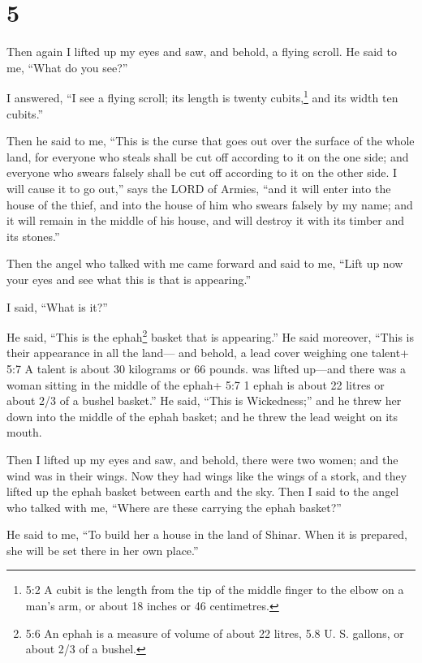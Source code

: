 \hypertarget{section-4}{%
\section{5}\label{section-4}}

 Then again I lifted up my eyes and saw, and behold, a
flying scroll.  He said to me, ``What do you see?''

I answered, ``I see a flying scroll; its length is twenty
cubits,\footnote{5:2 A cubit is the length from the tip of the middle
  finger to the elbow on a man's arm, or about 18 inches or 46
  centimetres.} and its width ten cubits.''

 Then he said to me, ``This is the curse that goes out over
the surface of the whole land, for everyone who steals shall be cut off
according to it on the one side; and everyone who swears falsely shall
be cut off according to it on the other side.  I will cause
it to go out,'' says the LORD of Armies, ``and it will enter into the
house of the thief, and into the house of him who swears falsely by my
name; and it will remain in the middle of his house, and will destroy it
with its timber and its stones.''

 Then the angel who talked with me came forward and said to
me, ``Lift up now your eyes and see what this is that is appearing.''

 I said, ``What is it?''

He said, ``This is the ephah\footnote{5:6 An ephah is a measure of
  volume of about 22 litres, 5.8 U. S. gallons, or about 2/3 of a
  bushel.} basket that is appearing.'' He said moreover, ``This is their
appearance in all the land---  and behold, a lead cover
weighing one talent+ 5:7 A talent is about 30 kilograms or 66 pounds.
was lifted up---and there was a woman sitting in the middle of the
ephah+ 5:7 1 ephah is about 22 litres or about 2/3 of a bushel basket.''
 He said, ``This is Wickedness;'' and he threw her down into
the middle of the ephah basket; and he threw the lead weight on its
mouth.

 Then I lifted up my eyes and saw, and behold, there were
two women; and the wind was in their wings. Now they had wings like the
wings of a stork, and they lifted up the ephah basket between earth and
the sky.  Then I said to the angel who talked with me,
``Where are these carrying the ephah basket?''

 He said to me, ``To build her a house in the land of
Shinar. When it is prepared, she will be set there in her own place.''


